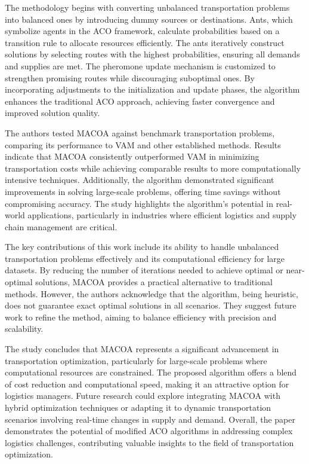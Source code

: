 The methodology begins with converting unbalanced transportation problems into balanced ones by introducing dummy sources or destinations. Ants, which symbolize agents in the ACO framework, calculate probabilities based on a transition rule to allocate resources efficiently. The ants iteratively construct solutions by selecting routes with the highest probabilities, ensuring all demands and supplies are met. The pheromone update mechanism is customized to strengthen promising routes while discouraging suboptimal ones. By incorporating adjustments to the initialization and update phases, the algorithm enhances the traditional ACO approach, achieving faster convergence and improved solution quality.

The authors tested MACOA against benchmark transportation problems, comparing its performance to VAM and other established methods. Results indicate that MACOA consistently outperformed VAM in minimizing transportation costs while achieving comparable results to more computationally intensive techniques. Additionally, the algorithm demonstrated significant improvements in solving large-scale problems, offering time savings without compromising accuracy. The study highlights the algorithm's potential in real-world applications, particularly in industries where efficient logistics and supply chain management are critical.

The key contributions of this work include its ability to handle unbalanced transportation problems effectively and its computational efficiency for large datasets. By reducing the number of iterations needed to achieve optimal or near-optimal solutions, MACOA provides a practical alternative to traditional methods. However, the authors acknowledge that the algorithm, being heuristic, does not guarantee exact optimal solutions in all scenarios. They suggest future work to refine the method, aiming to balance efficiency with precision and scalability.

The study concludes that MACOA represents a significant advancement in transportation optimization, particularly for large-scale problems where computational resources are constrained. The proposed algorithm offers a blend of cost reduction and computational speed, making it an attractive option for logistics managers. Future research could explore integrating MACOA with hybrid optimization techniques or adapting it to dynamic transportation scenarios involving real-time changes in supply and demand. Overall, the paper demonstrates the potential of modified ACO algorithms in addressing complex logistics challenges, contributing valuable insights to the field of transportation optimization.

